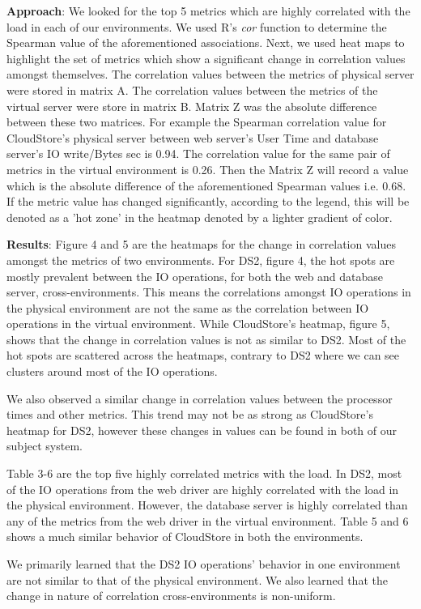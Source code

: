 \textbf{Approach}: We looked for the top 5 metrics which are highly correlated with the load in each of our environments. We used R's \textit{cor} function to determine the Spearman value of the aforementioned associations. 
Next, we used heat maps to highlight the set of metrics which show a significant change in correlation values amongst themselves.
The correlation values between the metrics of physical server were stored in matrix A. The correlation values between the metrics of the virtual server were store in matrix B. Matrix Z was the absolute difference between these two matrices. For example the Spearman correlation value for CloudStore's physical server between web server's User Time and database server's IO write/Bytes sec is 0.94. The correlation value for the same pair of metrics in the virtual environment is 0.26. Then the Matrix Z will record a value which is the absolute difference of the aforementioned Spearman values i.e. 0.68. If the metric value has changed significantly, according to the legend, this will be denoted as a 'hot zone' in the heatmap denoted by a lighter gradient of color.

\textbf{Results}: Figure 4 and 5 are the heatmaps for the change in correlation values amongst the metrics of two environments. For DS2, figure 4, the hot spots are mostly prevalent between the IO operations, for both the web and database server, cross-environments. This means the correlations amongst IO operations in the physical environment are not the same as the correlation between IO operations in the virtual environment. While CloudStore's heatmap, figure 5, shows that the change in correlation values is not as similar to DS2. Most of the hot spots are scattered across the heatmaps, contrary to DS2 where we can see clusters around most of the IO operations. 

We also observed a similar change in correlation values between the processor times and other metrics. This trend may not be as strong as CloudStore's heatmap for DS2, however these changes in values can be found in both of our subject system.

Table 3-6 are the top five highly correlated metrics with the load. In DS2, most of the IO operations from the web driver are highly correlated with the load in the physical environment. However, the database server is highly correlated than any of the metrics from the web driver in the virtual environment.
Table 5 and 6 shows a much similar behavior of CloudStore in both the environments.

We primarily learned that the DS2 IO operations' behavior in one environment are not similar to that of the physical environment. We also learned that the change in nature of correlation cross-environments is non-uniform.



